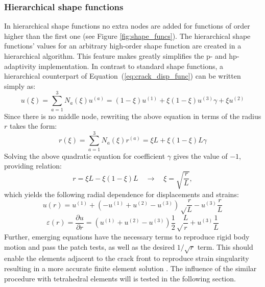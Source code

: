 \documentclass[11pt]{acmeArticle}
\numberwithin{equation}{section}
\begin{document}
\subsubsection{Hierarchical shape functions}
In hierarchical shape functions \citep{Ainsworth2003} no extra nodes are added for functions of order higher than the first one (see Figure \ref{fig:shape_funcs}). The hierarchical shape functions' values for an arbitrary high-order shape function are created in a hierarchical algorithm. This feature makes greatly simplifies the p- and hp- adaptivity implementation. In contrast to standard shape functions, a hierarchical counterpart of Equation~(\ref{eq:crack_disp_func}) can be written simply as:
\begin{equation}
u(\xi) = \sum_{a=1}^3 N_a (\xi) u^{(a)} = (1 -\xi)u^{(1)} + \xi(1 - \xi)u^{(3)}\gamma + \xi u^{(2)}
\end{equation}
Since there is no middle node, rewriting the above equation in terms of the radius $r$ takes the form:
\begin{equation}
r(\xi) = \sum_{a=1}^3 N_a (\xi) r^{(a)} = \xi L + \xi(1-\xi)  L  \gamma
\end{equation}
Solving the above quadratic equation for coefficient $\gamma$ gives the value of $-1$, providing relation:
\begin{equation}
r= \xi L - \xi(1-\xi)L \quad \rightarrow \quad \xi = \sqrt{\frac{r}{L}},
\end{equation}
which yields the following radial dependence for displacements and strains:
\begin{equation*}
u(r) = u^{(1)} + \left( -u^{(1)} + u^{(2)} - u^{(3)} \right) \sqrt \frac{r}{L} - u^{(3)} \frac{r}{L}
\end{equation*}
\begin{equation}
\varepsilon(r) = \frac{\partial u}{\partial r} = \left( u^{(1)}  + u^{(2)} - u^{(3)}  \right) \frac{1}{2} \sqrt \frac{L}{r} + u^{(3)} \frac{1}{L}
\end{equation}
Further, emerging equations have the necessary terms to reproduce rigid body motion and pass the patch tests, as well as the desired $1 / \sqrt r$ term.
This should enable the elements adjacent to the crack front to reproduce strain singularity resulting in a more accurate finite element solution \citep{nejati2015use}. The influence of the similar procedure with tetrahedral elements will is tested in the following section.
\end{document}
